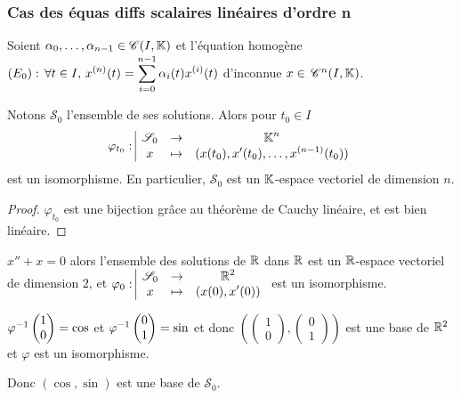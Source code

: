\subsubsection{Cas des équas diffs scalaires linéaires d'ordre n}

\begin{proposition}{}{}
    Soient $\alpha_0, \dots, \alpha_{n - 1} \in \mathscr C(I, \mathbb{K})$ et l'équation homogène
    $(E_0) : \, \forall t \in I, \, \displaystyle x^{(n)}(t) = \sum_{i = 0}^{n - 1} \alpha_i(t) x^{(i)}(t)$
    d'inconnue $x \in \,\mathscr C^{n} (I, \mathbb{K})$.

    
    \lvspace \avspace Notons $\mathscr S_0$ l'ensemble de ses solutions. Alors pour $t_0 \in I$ 
    $$\varphi_{t_0}: \space \begin{array}{|ccc} \displaystyle \mathscr S_0 & \to & \displaystyle \mathbb{K}^n \\ \displaystyle x & \mapsto & \displaystyle (x(t_0), x'(t_0), \dots, x^{(n - 1)}(t_0)) \end{array}$$ est un isomorphisme. 
    En particulier, $\mathscr S_0$ est un $\mathbb{K}$-espace vectoriel de dimension $n$.
\end{proposition}

\begin{proof}
    $\varphi_{t_0}$ est une bijection grâce au théorème de Cauchy linéaire, et est 
    bien linéaire. 
\end{proof}

\begin{exemple}
    $x'' + x = 0$ alors l'ensemble des solutions de $\mathbb{R}$ dans $\mathbb{R}$ est un 
    $\mathbb{R}$-espace vectoriel de dimension $2$, et 
    $\varphi_0: \space \begin{array}{|ccc} \displaystyle \mathscr S_0 & \to & \displaystyle \mathbb{R}^2 \\ \displaystyle x & \mapsto & \displaystyle (x(0), x'(0)) \end{array}$ est un isomorphisme.

    $\varphi^{-1} \begin{pmatrix}
    1 \\ 0
    \end{pmatrix} = \cos$ et $\varphi^{-1} \begin{pmatrix}
    0 \\ 1
    \end{pmatrix} = \sin$ et donc $\left( \begin{pmatrix}
        1 \\ 0
    \end{pmatrix}, 
    \begin{pmatrix}
        0 \\ 1
    \end{pmatrix} \right)$ est une base de $\mathbb{R}^2$ et $\varphi$ est un isomorphisme. 

    Donc $(\cos, \sin)$ est une base de $\mathscr S_0$. 
\end{exemple}


